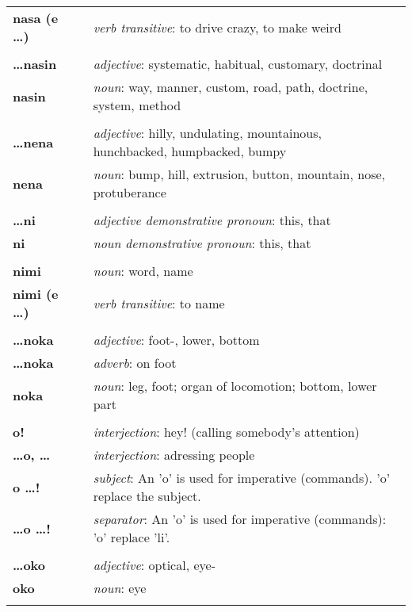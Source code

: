 \begin{supertabular}{p{2,5cm}|ll}
\textbf{nasa (e \dots)} && \textit{verb transitive}: to drive crazy, to make weird \\ 
 && \\ %
\textbf{\dots nasin} && \textit{adjective}: systematic, habitual, customary, doctrinal \\ 
\textbf{nasin} && \textit{noun}: way, manner, custom, road, path, doctrine, system, method \\ 
 && \\ %
\textbf{\dots nena} && \textit{adjective}: hilly, undulating, mountainous, hunchbacked, humpbacked, bumpy \\ 
\textbf{nena} && \textit{noun}: bump, hill, extrusion, button, mountain, nose, protuberance \\ 
 && \\ %
\textbf{\dots ni} && \textit{adjective demonstrative pronoun}: this, that \\ 
\textbf{ni} && \textit{noun demonstrative pronoun}: this, that \\ 
 && \\ %
\textbf{nimi} && \textit{noun}: word, name \\ 
\textbf{nimi (e \dots )} && \textit{verb transitive}: to name \\ 
 && \\ %
\textbf{\dots noka} && \textit{adjective}: foot-, lower, bottom \\  
\textbf{ \dots noka } && \textit{adverb}: on foot \\  
\textbf{noka} && \textit{noun}: leg, foot; organ of locomotion; bottom, lower part \\ 
 && \\ %
\textbf{o!} && \textit{interjection}: hey! (calling somebody's attention) \\ 
\textbf{\dots o, \dots} && \textit{interjection}: adressing people \\ 
\textbf{o \dots !} && \textit{subject}: An 'o' is used for imperative (commands). 'o' replace the subject.  \\ 
\textbf{\dots o \dots !} && \textit{separator}: An 'o' is used for imperative (commands): 'o' replace 'li'. \\ 
 && \\ %
\textbf{\dots oko} && \textit{adjective}: optical, eye- \\ 
\textbf{oko} && \textit{noun}: eye \\ 
 && \\ %

\end{supertabular}
